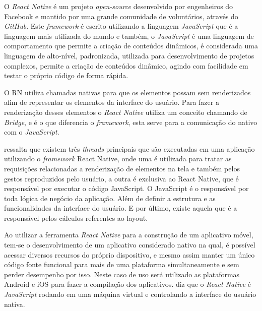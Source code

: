O \textit{React Native} é um projeto \textit{open-source} desenvolvido por engenheiros do Facebook e mantido por uma grande comunidade de voluntários, através do \textit{GitHub}. Este \textit{framework} é escrito utilizando a linguagem \textit{JavaScript} que é a linguagem mais utilizada do mundo e também, o \textit{JavaScript} é uma linguagem de comportamento que permite a criação de conteúdos dinâmicos, é considerada uma linguagem de alto-nível, padronizada, utilizada para desenvolvimento de projetos complexos, permite a criação de conteúdos dinâmico, agindo com facilidade em testar o próprio código de forma rápida. \cite{javascript}

O RN utiliza chamadas nativas para que os elementos possam sem renderizados afim de representar os elementos da interface do usuário. Para fazer a renderização desses elementos o \textit{React Native} utiliza um conceito chamando de \textit{Bridge}, e é o que diferencia o \textit{framework}, esta serve para a comunicação do nativo com o \textit{JavaScript}.

\cite{rn} ressalta que existem três \textit{threads} principais que são executadas em uma aplicação utilizando o \textit{framework} React Native, onde uma é utilizada para tratar as requisições relacionadas a renderização de elementos na tela e também pelos gestos reproduzidos pelo usuário, a outra é exclusiva ao React Native, que é responsável por executar o código JavaScript. O JavaScript é o responsável por toda lógica de negócio da aplicação. Além de definir a estrutura e as funcionalidades da interface do usuário. E por último, existe aquela que é a responsável pelos cálculos referentes ao layout. 


Ao utilizar a ferramenta \textit{React Native} para a construção de um aplicativo móvel, tem-se o desenvolvimento de um aplicativo considerado nativo na qual, é possível acessar diversos recursos do próprio dispositivo, e mesmo assim manter um único código fonte funcional para mais de uma plataforma simultaneamente e sem perder desempenho por isso. Neste caso de uso será utilizado as plataformas Android e iOS para fazer a compilação dos aplicativos.
 diz que o \textit{React Native} é \textit{JavaScript} rodando em uma máquina virtual e controlando a interface do usuário nativa.



